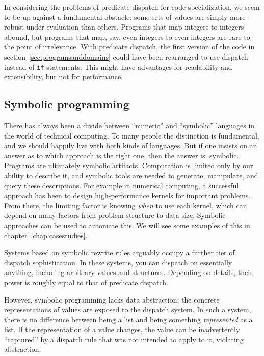 In considering the problems of predicate dispatch for code specialization,
we seem to be up against a fundamental obstacle: some sets of values are
simply more robust under evaluation than others.
Programs that map integers to integers abound, but programs that map, say,
even integers to even integers are rare to the point of irrelevance.
With predicate dispatch, the first version of the code in
section~\ref{sec:programsanddomains} could have been rearranged to use
dispatch instead of \texttt{if} statements.
This might have advantages for readability and extensibility, but not for
performance.


\subsection{Symbolic programming}

There has always been a divide between ``numeric'' and ``symbolic''
languages in the world of technical computing.
To many people the distinction is fundamental, and we should happily live
with both kinds of languages.
But if one insists on an answer as to which approach is the right one,
then the answer is: symbolic.
Programs are ultimately symbolic artifacts.
Computation is limited only by our ability to describe it, and
symbolic tools are needed to generate, manipulate, and query these
descriptions.
For example in numerical computing, a successful approach has been to
design high-performance kernels for important problems.
From there, the limiting factor is knowing \emph{when} to use each
kernel, which can depend on many factors from problem structure to
data size.
Symbolic approaches can be used to automate this.
We will see some examples of this in chapter~\ref{chap:casestudies}.

Systems based on symbolic rewrite rules arguably occupy a further tier of
dispatch sophistication.
In these systems, you can dispatch on essentially anything, including arbitrary
values and structures.
Depending on details, their power is roughly equal to that of predicate
dispatch.

However, symbolic programming lacks data abstraction: the concrete
representations of values are exposed to the dispatch system.
In such a system, there is no difference between being a list and being
something \emph{represented} as a list.
If the representation of a value changes, the value can be inadvertently
``captured'' by a dispatch rule that was not intended to apply to it,
violating abstraction.


